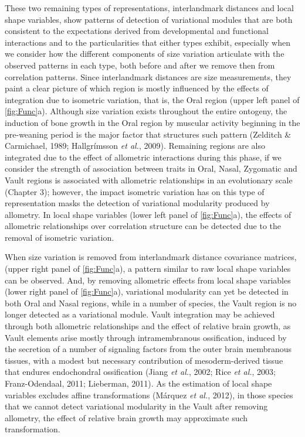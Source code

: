 \documentclass[12pt,]{article}
\begin{document}
These two remaining types of representations, interlandmark distances
and local shape variables, show patterns of detection of variational
modules that are both consistent to the expectations derived from
developmental and functional interactions and to the particularities
that either types exhibit, especially when we consider how the different
components of size variation articulate with the observed patterns in
each type, both before and after we remove then from correlation
patterns. Since interlandmark distances are size measurements, they
paint a clear picture of which region is mostly influenced by the
effects of integration due to isometric variation, that is, the Oral
region (upper left panel of \autoref{fig:Func}a). Although size
variation exists throughout the entire ontogeny, the induction of bone
growth in the Oral region by muscular activity beginning in the
pre-weaning period is the major factor that structures such pattern
(Zelditch \& Carmichael, 1989; Hallgrímsson \emph{et al.}, 2009).
Remaining regions are also integrated due to the effect of allometric
interactions during this phase, if we consider the strength of
association between traits in Oral, Nasal, Zygomatic and Vault regions
is associated with allometric relationships in an evolutionary scale
(Chapter 3); however, the impact isometric variation has on this type of
representation masks the detection of variational modularity produced by
allometry. In local shape variables (lower left panel of
\autoref{fig:Func}a), the effects of allometric relationships over
correlation structure can be detected due to the removal of isometric
variation.

When size variation is removed from interlandmark distance covariance
matrices, (upper right panel of \autoref{fig:Func}a), a pattern similar
to raw local shape variables can be observed. And, by removing
allometric effects from local shape variables (lower right panel of
\autoref{fig:Func}a), variational modularity can yet be detected in both
Oral and Nasal regions, while in a number of species, the Vault region
is no longer detected as a variational module. Vault integration may be
achieved through both allometric relationships and the effect of
relative brain growth, as Vault elements arise mostly through
intramembranous ossification, induced by the secretion of a number of
signaling factors from the outer brain membranous tissues, with a modest
but necessary contribution of mesoderm-derived tissue that endures
endochondral ossification (Jiang \emph{et al.}, 2002; Rice \emph{et
al.}, 2003; Franz-Odendaal, 2011; Lieberman, 2011). As the estimation of
local shape variables excludes affine transformations (Márquez \emph{et
al.}, 2012), in those species that we cannot detect variational
modularity in the Vault after removing allometry, the effect of relative
brain growth may approximate such transformation.
\end{document}
